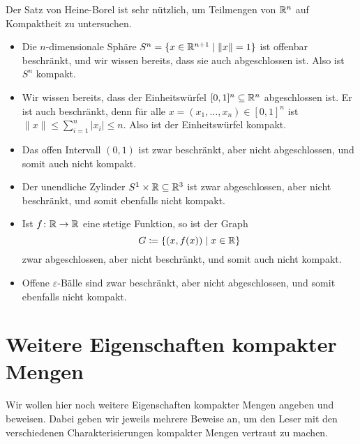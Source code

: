 \documentclass[a4paper,10pt]{article}
\begin{document}
Der Satz von Heine-Borel ist sehr nützlich, um Teilmengen von $\mathbb{R}^n$ auf Kompaktheit zu untersuchen.


\begin{bsp}
 \begin{itemize}
  \item
   Die $n$-dimensionale Sphäre $S^n = \{x \in \mathbb{R}^{n+1} \mid \|x\| = 1\}$ ist offenbar beschränkt, und wir wissen bereits, dass sie auch abgeschlossen ist. Also ist $S^n$ kompakt.
  \item
   Wir wissen bereits, dass der Einheitswürfel $[0,1]^n \subseteq \mathbb{R}^n$ abgeschlossen ist. Er ist auch beschränkt, denn für alle $x = (x_1, \dotsc, x_n) \in [0,1]^n$ ist $\|x\| \leq \sum_{i=1}^n |x_i| \leq n$. Also ist der Einheitswürfel kompakt.
  \item
   Das offen Intervall $(0,1)$ ist zwar beschränkt, aber nicht abgeschlossen, und somit auch nicht kompakt.
  \item
   Der unendliche Zylinder $S^1 \times \mathbb{R} \subseteq \mathbb{R}^3$ ist zwar abgeschlossen, aber nicht beschränkt, und somit ebenfalls nicht kompakt.
  \item
   Ist $f \colon \mathbb{R} \to \mathbb{R}$ eine stetige Funktion, so ist der Graph
   \[
    G \coloneqq \{(x,f(x)) \mid x \in \mathbb{R}\}
   \]
   zwar abgeschlossen, aber nicht beschränkt, und somit auch nicht kompakt.
  \item
   Offene $\varepsilon$-Bälle sind zwar beschränkt, aber nicht abgeschlossen, und somit ebenfalls nicht kompakt.
  \end{itemize}
\end{bsp}





\section{Weitere Eigenschaften kompakter Mengen}
Wir wollen hier noch weitere Eigenschaften kompakter Mengen angeben und beweisen. Dabei geben wir jeweils mehrere Beweise an, um den Leser mit den verschiedenen Charakterisierungen kompakter Mengen vertraut zu machen.
\end{document}
